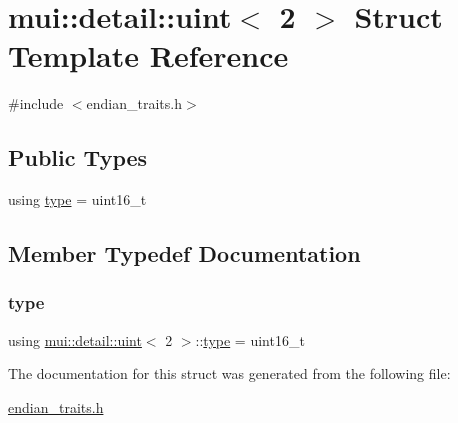 \hypertarget{structmui_1_1detail_1_1uint_3_012_01_4}{}\section{mui\+:\+:detail\+:\+:uint$<$ 2 $>$ Struct Template Reference}
\label{structmui_1_1detail_1_1uint_3_012_01_4}


{\ttfamily \#include $<$endian\+\_\+traits.\+h$>$}

\subsection*{Public Types}
\begin{DoxyCompactItemize}
\item 
using \hyperlink{structmui_1_1detail_1_1uint_3_012_01_4_a8ca461264c34fce86aca71475ac26805}{type} = uint16\+\_\+t
\end{DoxyCompactItemize}


\subsection{Member Typedef Documentation}
\mbox{\label{structmui_1_1detail_1_1uint_3_012_01_4_a8ca461264c34fce86aca71475ac26805}} 
\subsubsection{\texorpdfstring{type}{type}}
{\footnotesize\ttfamily using \hyperlink{structmui_1_1detail_1_1uint}{mui\+::detail\+::uint}$<$ 2 $>$\+::\hyperlink{structmui_1_1detail_1_1uint_3_012_01_4_a8ca461264c34fce86aca71475ac26805}{type} =  uint16\+\_\+t}



The documentation for this struct was generated from the following file\+:\begin{DoxyCompactItemize}
\item 
\hyperlink{endian__traits_8h}{endian\+\_\+traits.\+h}\end{DoxyCompactItemize}
